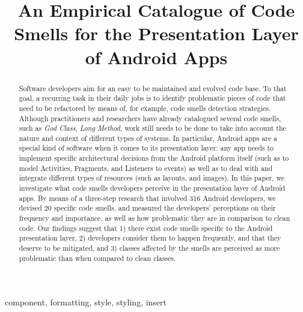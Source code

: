 \documentclass[conference]{IEEEtran}
\begin{document}
\title{An Empirical Catalogue of Code Smells for the Presentation Layer of Android Apps}

\author{
\and
{}
\and
{}
}

\maketitle

\begin{abstract} 

Software developers aim for an easy to be maintained and evolved
code base.
To that goal, a recurring task in their daily jobs is to
identify problematic pieces of code that need to be refactored
by means of, for example, code smells detection strategies. Although
practitioners and researchers have already catalogued several code smells, 
such as \textit{God Class}, \textit{Long Method}, work still needs to be
done to take into account the nature and context of different
types of systems. In particular, Android apps are a special kind of software
when it comes to its presentation layer:
any app needs to implement specific architectural decisions from the Android
platform itself (such as to model Activities, Fragments, and Listeners to events) 
as well as to deal with and integrate different types of resources (such as layouts, and images).
In this paper, we investigate what code smells developers perceive in the presentation
layer of Android apps. By means of a three-step research that involved 316 Android developers,
we devised 20 specific code smells, and measured the developers' perceptions on their frequency and importance,
as well as how problematic they are in comparison to clean code.
Our findings suggest that 1) there exist code smells specific to the Android presentation layer, 
2) developers consider them to happen frequently, and that they deserve to be mitigated, and 
3) classes affected by the smells are perceived as more problematic than when compared to clean
classes. 

\end{abstract}

\begin{IEEEkeywords}
component, formatting, style, styling, insert
\end{IEEEkeywords}











\end{document}

